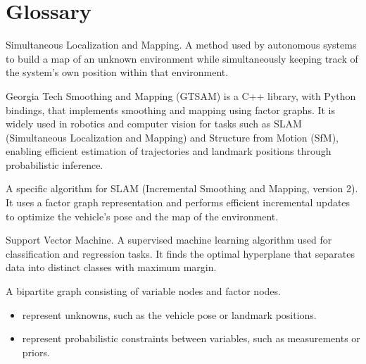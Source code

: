 \documentclass[letterpaper,10pt,english]{sphinxmanual}
\begin{document}
\section{Glossary}
\label{\detokenize{glossary:glossary}}\label{\detokenize{glossary::doc}}\begin{description}
\sphinxAtStartPar
Simultaneous Localization and Mapping. A method used by autonomous systems to build a map of an unknown environment while simultaneously keeping track of the system’s own position within that environment.

\sphinxAtStartPar
Georgia Tech Smoothing and Mapping (GTSAM) is a C++ library, with Python bindings, that implements smoothing and mapping using factor graphs. It is widely used in robotics and computer vision for tasks such as SLAM (Simultaneous Localization and Mapping) and Structure from Motion (SfM), enabling efficient estimation of trajectories and landmark positions through probabilistic inference.

\sphinxAtStartPar
A specific algorithm for SLAM (Incremental Smoothing and Mapping, version 2). It uses a factor graph representation and performs efficient incremental updates to optimize the vehicle’s pose and the map of the environment.

\sphinxAtStartPar
Support Vector Machine. A supervised machine learning algorithm used for classification and regression tasks. It finds the optimal hyperplane that separates data into distinct classes with maximum margin.

\sphinxAtStartPar
A bipartite graph consisting of variable nodes and factor nodes.
\begin{itemize}
\item {} 
\sphinxAtStartPar
{} represent unknowns, such as the vehicle pose or landmark positions.

\item {} 
\sphinxAtStartPar
{} represent probabilistic constraints between variables, such as measurements or priors.


\end{itemize}
\end{description}
\end{document}
